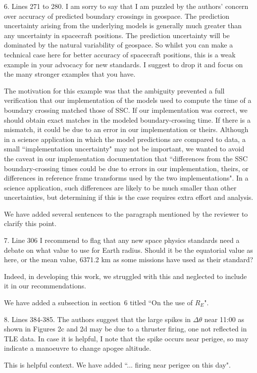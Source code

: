 \documentclass[11pt]{article}
\begin{document}
6. Lines 271 to 280. I am sorry to say that I am puzzled by the authors’ concern over accuracy of predicted boundary crossings in geospace. The prediction uncertainty arising from the underlying models is generally much greater than any uncertainty in spacecraft positions. The prediction uncertainty will be dominated by the natural variability of geospace. So whilst you can make a technical case here for better accuracy of spacecraft positions, this is a weak example in your advocacy for new standards. I suggest to drop it and focus on the many stronger examples that you have.
\\
{\color{violet}
\begin{leftbar}
The motivation for this example was that the ambiguity prevented a full verification that our implementation of the models used to compute the time of a boundary crossing matched those of SSC. If our implementation was correct, we should obtain exact matches in the modeled boundary-crossing time. If there is a mismatch, it could be due to an error in our implementation or theirs. Although in a science application in which the model predictions are compared to data, a small ``implementation uncertainty" may not be important, we wanted to avoid the caveat in our implementation documentation that ``differences from the SSC boundary-crossing times could be due to errors in our implementation, theirs, or differences in reference frame transforms used by the two implementations". In a science application, such differences are likely to be much smaller than other uncertainties, but determining if this is the case requires extra effort and analysis.

We have added several sentences to the paragraph mentioned by the reviewer to clarify this point.
\end{leftbar}
}

7. Line 306 I recommend to flag that any new space physics standards need a debate on what value to use for Earth radius. Should it be the equatorial value as here, or the mean value, 6371.2 km as some missions have used as their standard?
\\
{\color{violet}
\begin{leftbar}
Indeed, in developing this work, we struggled with this and neglected to include it in our recommendations.

We have added a subsection in section~6 titled ``On the use of $R_E$". 
\end{leftbar}
}

8. Lines 384-385. The authors suggest that the large spikes in $\Delta\theta$ near 11:00 as shown in Figures 2c and 2d may be due to a thruster firing, one not reflected in TLE data. In case it is helpful, I note that the spike occurs near perigee, so may indicate a manoeuvre to change apogee altitude.
\\
{\color{violet}
\begin{leftbar}
This is helpful context. We have added ``... firing near perigee on this day".
\end{leftbar}
}
\end{document}
